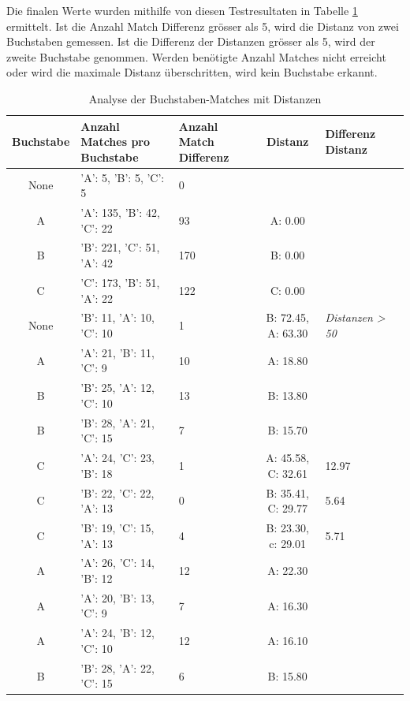 Die finalen Werte wurden mithilfe von diesen Testresultaten in Tabelle \ref{letter-matches-orb} ermittelt. Ist die Anzahl Match Differenz grösser als 5, wird die Distanz von zwei Buchstaben gemessen.  Ist die Differenz der Distanzen grösser als 5, wird der zweite Buchstabe genommen. Werden benötigte Anzahl Matches nicht erreicht oder wird die maximale Distanz überschritten, wird kein Buchstabe erkannt.

\begin{table}[H]
\centering
\small
\begin{tabularx}{\textwidth}{|c|X|X|c|X|c|}
\hline
\textbf{Buchstabe} & \textbf{Anzahl Matches pro Buchstabe} & \textbf{Anzahl Match Differenz} & \textbf{Distanz} & \textbf{Differenz Distanz} \\
\hline
None & {'A': 5, 'B': 5, 'C': 5} & 0 &  &  \\
\hline
A & {'A': 135, 'B': 42, 'C': 22} & 93 & A: 0.00 &  \\
\hline
B & {'B': 221, 'C': 51, 'A': 42} & 170 & B: 0.00 &  \\
\hline
C & {'C': 173, 'B': 51, 'A': 22} & 122 & C: 0.00 &  \\
\hline
None & {'B': 11, 'A': 10, 'C': 10} & 1 & B: 72.45, A: 63.30 & \textit{Distanzen > 50}\\
\hline
A & {'A': 21, 'B': 11, 'C': 9} & 10 & A: 18.80 &  \\
\hline
B & {'B': 25, 'A': 12, 'C': 10} & 13 & B: 13.80 &  \\
\hline
B & {'B': 28, 'A': 21, 'C': 15} & 7 & B: 15.70 &  \\
\hline
C & {'A': 24, 'C': 23, 'B': 18} & 1 & A: 45.58, C: 32.61 & 12.97 \\
\hline
C & {'B': 22, 'C': 22, 'A': 13} & 0 & B: 35.41, C: 29.77 & 5.64 \\
\hline
C & {'B': 19, 'C': 15, 'A': 13} & 4 & B: 23.30, c: 29.01 & 5.71 \\
\hline
A & {'A': 26, 'C': 14, 'B': 12} & 12 & A: 22.30 &  \\
\hline
A & {'A': 20, 'B': 13, 'C': 9} & 7 & A: 16.30 &  \\
\hline
A & {'A': 24, 'B': 12, 'C': 10} & 12 & A: 16.10 &  \\
\hline
B & {'B': 28, 'A': 22, 'C': 15} & 6 & B: 15.80 &  \\
\hline
\end{tabularx}
\caption{Analyse der Buchstaben-Matches mit Distanzen}
\label{letter-matches-orb}
\end{table}

